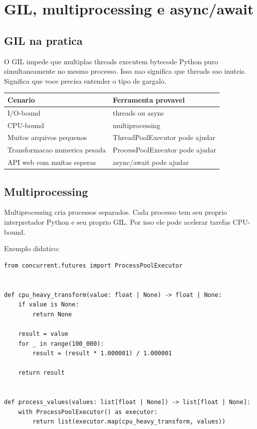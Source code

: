 \chapter{GIL, multiprocessing e async/await}

\section{GIL na pratica}

O GIL impede que multiplas threads executem bytecode Python puro simultaneamente no mesmo processo. Isso nao significa que threads sao inuteis. Significa que voce precisa entender o tipo de gargalo.

\begin{longtable}{p{4cm}p{8cm}}
\toprule
\textbf{Cenario} & \textbf{Ferramenta provavel} \\
\midrule
I/O-bound & threads ou async \\
CPU-bound & multiprocessing \\
Muitos arquivos pequenos & ThreadPoolExecutor pode ajudar \\
Transformacao numerica pesada & ProcessPoolExecutor pode ajudar \\
API web com muitas esperas & async/await pode ajudar \\
\bottomrule
\end{longtable}

\section{Multiprocessing}

Multiprocessing cria processos separados. Cada processo tem seu proprio interpretador Python e seu proprio GIL. Por isso ele pode acelerar tarefas CPU-bound.

Exemplo didatico:

\begin{lstlisting}[style=devbutterpython]
from concurrent.futures import ProcessPoolExecutor


def cpu_heavy_transform(value: float | None) -> float | None:
    if value is None:
        return None

    result = value
    for _ in range(100_000):
        result = (result * 1.000001) / 1.000001

    return result


def process_values(values: list[float | None]) -> list[float | None]:
    with ProcessPoolExecutor() as executor:
        return list(executor.map(cpu_heavy_transform, values))
\end{lstlisting}

